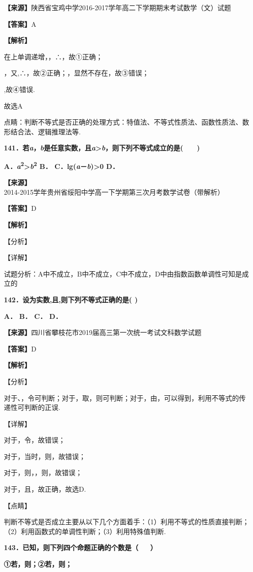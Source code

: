 \textbf{【来源】}陕西省宝鸡中学2016-2017学年高二下学期期末考试数学（文）试题

\textbf{【答案】}A

\textbf{【解析】}

在上单调递增，，∴，故①正确；

，又,∴，故②正确；，显然不存在，故③错误；

,故④错误.

故选A

点睛：判断不等式是否正确的处理方式：特值法、不等式性质法、函数性质法、数形结合法、逻辑推理法等.

\textbf{141．若\emph{a}，\emph{b}是任意实数，且\emph{a}\textgreater{}\emph{b}，则下列不等式成立的是(　　)}

\textbf{A．\emph{a}\textsuperscript{2}\textgreater{}\emph{b}\textsuperscript{2}
B． C．lg(\emph{a}－\emph{b})\textgreater0 D．}

\textbf{【来源】}2014-2015学年贵州省绥阳中学高一下学期第三次月考数学试卷（带解析）

\textbf{【答案】}D

\textbf{【解析】}

【分析】

【详解】

试题分析：A中不成立，B中不成立，C中不成立，D中由指数函数单调性可知是成立的

\textbf{142．设为实数,且,则下列不等式正确的是( )}

\textbf{A． B． C． D．}

\textbf{【来源】}四川省攀枝花市2019届高三第一次统一考试文科数学试题

\textbf{【答案】}D

\textbf{【解析】}

【分析】

对于、，令可判断；对于，取，则可判断；对于，由，可以得到，利用不等式的传递性可判断的正误.

【详解】

对于，令，故错误；

对于，当时，则，故错误；

对于，则，，则，故错误；

对于，且，故正确，故选D.

【点睛】

判断不等式是否成立主要从以下几个方面着手：（1）利用不等式的性质直接判断；（2）利用函数式的单调性判断；（3）利用特殊值判断.

\textbf{143．已知，则下列四个命题正确的个数是（ 　 ）}

\textbf{①若，则；②若，则；}

